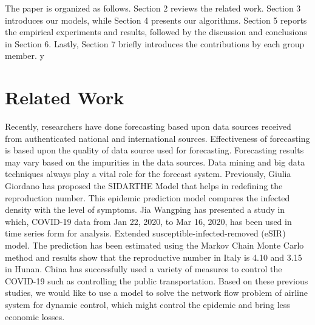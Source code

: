 \documentclass[11pt,twocolumn]{article}
\begin{document}
The paper is organized as follows. Section 2 reviews the related work. Section 3 introduces our models, while Section 4 presents our algorithms. Section 5 reports the empirical experiments and results, followed by the discussion and conclusions in Section 6. Lastly, Section 7 briefly introduces the contributions by each group member. 
y


\section{Related Work}
Recently, researchers have done forecasting based upon data sources received from authenticated national and international sources. Effectiveness of forecasting is based upon the quality of data source used for forecasting. Forecasting results may vary based on the impurities in the data sources. Data mining and big data techniques always play a vital role for the forecast system\cite{huang2018air}. Previously, Giulia Giordano\cite{giordano2020sidarthe} has proposed the SIDARTHE Model that helps in redefining the reproduction number. This epidemic prediction model compares the infected density with the level of symptoms. Jia Wangping\cite{wangping2020extended} has presented a study in which, COVID-19 data from Jan 22, 2020, to Mar 16, 2020, has been used in time series form for analysis. Extended susceptible-infected-removed (eSIR) model. The prediction has been estimated using the Markov Chain Monte Carlo method and results show that the reproductive number in Italy is 4.10 and 3.15 in Hunan. China has successfully used a variety of measures to control the COVID-19 such as controlling the public transportation\cite{shen2020prevention,kucharski2020early}. Based on these previous studies, we would like to use a model to solve the network flow problem of airline system for dynamic control, which might control the epidemic and bring less economic losses. 
\end{document}
